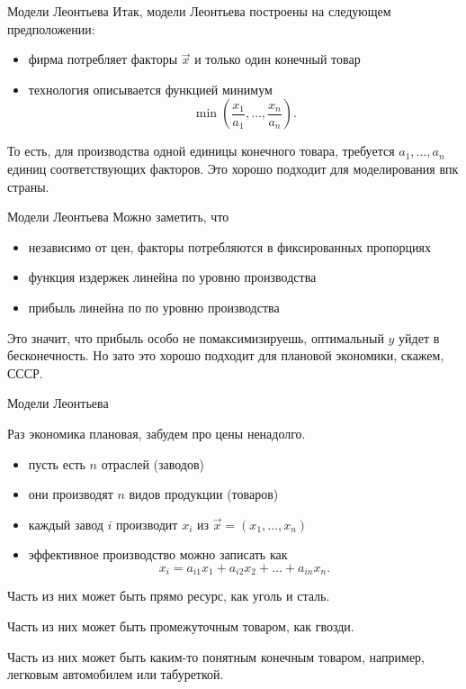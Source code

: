 \documentclass{beamer}
\begin{document}
\begin{frame}{Модели Леонтьева}
Итак, модели Леонтьева построены на следующем предположении:

\begin{itemize}
  \item фирма потребляет факторы $\vec x$ и только один конечный товар
  \item технология описывается функцией минимум
$$ \min(\frac{x_1}{a_1}, \ldots, \frac{x_n}{a_n}).$$
\end{itemize}
То есть, для производства одной единицы конечного товара, требуется $a_1, \ldots, a_n$ единиц соответствующих факторов. Это хорошо подходит для моделирования впк страны.
\end{frame}

\begin{frame}{Модели Леонтьева}
Можно заметить, что

\begin{itemize}
  \item независимо от цен, факторы потребляются в фиксированных пропорциях
  \item функция издержек линейна по уровню производства
  \item прибыль линейна по по уровню производства
\end{itemize}

Это значит, что прибыль особо не помаксимизируешь, оптимальный $y$ уйдет в бесконечность. Но зато это хорошо подходит для плановой экономики, скажем, СССР.
 
\end{frame}

\begin{frame}{Модели Леонтьева}

Раз экономика плановая, забудем про цены ненадолго.

\begin{itemize}
  \item пусть есть $n$ отраслей (заводов)
  \item они производят $n$ видов продукции (товаров)
  \item каждый завод $i$ производит $x_i$ из $\vec x = (x_1, \ldots, x_n)$
  \item эффективное производство можно записать как
      $$ x_i = a_{i1} x_1 + a_{i2} x_2 + \ldots + a_{in} x_n.$$
\end{itemize}

Часть из них может быть прямо ресурс, как уголь и сталь.

Часть из них может быть промежуточным товаром, как гвозди.

Часть из них может быть каким-то понятным конечным товаром, например, легковым автомобилем или табуреткой.
\end{frame}
\end{document}
